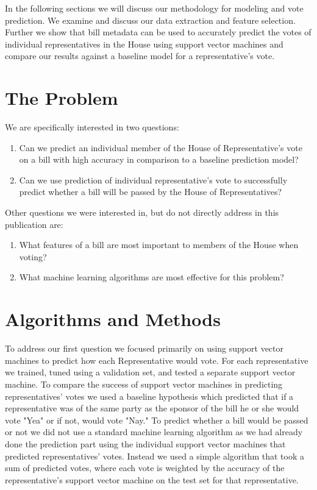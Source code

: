 \documentclass[11pt,letterpaper,twocolumn]{article}
\begin{document}
	In the following sections we will discuss our methodology for modeling and vote prediction. We examine and discuss our data extraction and feature selection. Further we show that bill metadata can be used to accurately predict the votes of individual representatives in the House using support vector machines and compare our results against a baseline model for a representative's vote. 

\section{The Problem}
We are specifically interested in two questions: 
\begin{enumerate}
\item Can we predict an individual member of the House of Representative's vote on a bill with high accuracy in comparison to a baseline prediction model?
\item Can we use prediction of individual representative's vote to successfully predict whether a bill will be passed by the House of Representatives?
\end{enumerate}

\noindent Other questions we were interested in, but do not directly address in this publication are:

\begin{enumerate}
\item What features of a bill are most important to members of the House when voting?
\item What machine learning algorithms are most effective for this problem?
\end{enumerate}

\section{Algorithms and Methods}
To address our first question we focused primarily on using support vector machines to predict how each Representative would vote. For each representative we trained, tuned using a validation set, and tested a separate support vector machine. To compare the success of support vector machines in predicting representatives' votes we used a baseline hypothesis which predicted that if a representative was of the same party as the sponsor of the bill he or she would vote "Yea" or if not, would vote "Nay." To predict whether a bill would be passed or not we did not use a standard machine learning algorithm as we had already done the prediction part using the individual support vector machines that predicted representatives' votes. Instead we used a simple algorithm that took a sum of predicted votes, where each vote is weighted by the accuracy of the representative's support vector machine on the test set for that representative. 
\end{document}

